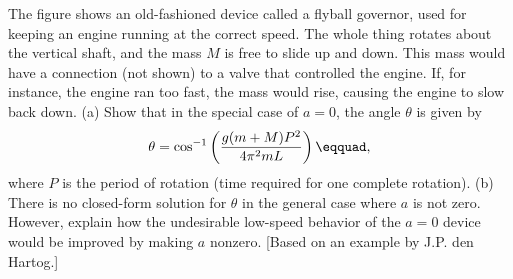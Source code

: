  The figure shows an old-fashioned device called a
flyball governor, used for keeping an engine running at the
correct speed. The whole thing rotates about the vertical
shaft, and the mass $M$ is free to slide up and down. This
mass would have a connection (not shown) to a valve that
controlled the engine. If, for instance, the engine ran too
fast, the mass would rise, causing the engine to slow back down.\hwendpart
(a) Show that in the special case of $a=0$, the angle
$\theta $ is given by
\begin{equation*}
        \theta  =  \cos^{-1}\left(\frac{g(m+M)P^2}{4\pi^2mL}\right)\eqquad,
\end{equation*}
where $P$ is the period of rotation (time required for
one complete rotation).\hwendpart
(b) There is no closed-form solution for $\theta $ in the
general case where $a$ is not zero. However, explain how the
undesirable low-speed behavior of the $a=0$ device would be
improved by making $a$ nonzero.\hwendpart
[Based on an example by J.P. den Hartog.]
